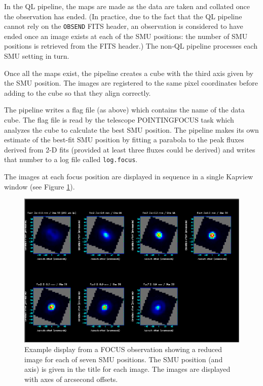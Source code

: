 \documentclass[twoside,11pt]{article}
\renewcommand{\_}{\texttt{\symbol{95}}}
\begin{document}
In the QL pipeline, the maps are made as the data are taken and
collated once the observation has ended. (In practice, due to the fact
that the QL pipeline cannot rely on the \verb+OBSEND+ FITS header, an
observation is considered to have ended once an image exists at each
of the SMU positions: the number of SMU positions is retrieved from
the FITS header.) The non-QL pipeline processes each SMU setting in
turn.

Once all the maps exist, the pipeline creates a cube with the third
axis given by the SMU position. The images are registered to the same
pixel coordinates before adding to the cube so that they align
correctly.

The pipeline writes a flag file (as above) which contains the name of
the data cube. The flag file is read by the telescope POINTING\_FOCUS
task which analyzes the cube to calculate the best SMU position. The
pipeline makes its own estimate of the best-fit SMU position by
fitting a parabola to the peak fluxes derived from 2-D fits (provided
at least three fluxes could be derived) and writes that number to a
log file called \verb+log.focus+.

The images at each focus position are displayed in sequence in a
single Kapview window (see Figure \ref{fig:focus}).

\begin{figure}[t]
\centering
\includegraphics[width=\textwidth]{sun264_focus}
\caption{Example display from a FOCUS observation showing a reduced
  image for each of seven SMU positions. The SMU position (and axis)
  is given in the title for each image. The images are displayed with
  axes of arcsecond offsets.\label{fig:focus}}
\end{figure}
\end{document}
